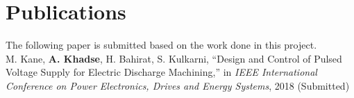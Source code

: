 \begin{comment}
\subsection{Hardware}
    The \autoref{chap:hardware} described the fabrication details of the hardware setup developed. Several issues in sensing circuits were addressed before proposing the final voltage and control circuits. These in situ sensors were tested before being used in the main converter. The power electronic circuit was a pre-assembled IGBT module arrangement with gate drivers. However, the auxiliary circuitry required to drive these switches was designed and tested specifically for the specific processor and drivers.
    
    This work outlines the general requirements and procedure for assembling a power supply unit. The design presented for high frequency current and voltage sensors is of peculiar importance to manufacturing processes as it indirectly helps pacing up the operation.

\subsection{Improvements}
    The nonlinear control technique of sliding mode control is reviewed in \autoref{chap:nonlinear}. An implementation of this controller was simulated. The steady state error was also addressed in this regard. 
    
    Non linear control techniques overcome the problem of operation in a small neighbourhood of the equilibrium point which is inherent to the linear controllers. Thus, this method can improve the dynamic ranges of the individual current and the voltage sources. This will be of utility in investigation of other unconventional loads for the WEDM process.
\end{comment}

\section{Publications}
The following paper is submitted based on the work done in this project.\\
M. Kane, \textbf{A. Khadse}, H. Bahirat, S. Kulkarni, ``Design and Control of Pulsed Voltage Supply for Electric Discharge Machining,'' in \textit{IEEE International Conference on Power Electronics, Drives and Energy Systems}, 2018 (Submitted)